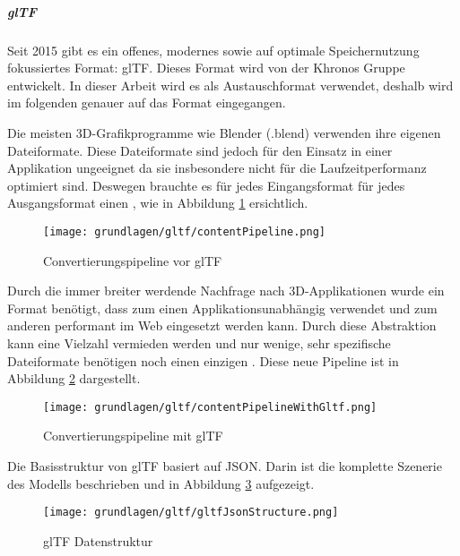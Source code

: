 \subparagraph{glTF}
Seit 2015 gibt es ein offenes, modernes sowie auf optimale Speichernutzung fokussiertes Format: glTF. Dieses Format wird von der Khronos Gruppe entwickelt. \cite{gltf1Spec} In dieser Arbeit wird es als Austauschformat verwendet, deshalb wird im folgenden genauer auf das Format eingegangen.

Die meisten 3D-Grafikprogramme wie Blender (.blend) verwenden ihre eigenen Dateiformate. Diese Dateiformate sind jedoch für den Einsatz in einer Applikation ungeeignet da sie insbesondere nicht für die Laufzeitperformanz optimiert sind. Deswegen brauchte es für jedes Eingangsformat für jedes Ausgangsformat einen , wie in Abbildung \ref{fig:contentPipelineWithoutGltf} ersichtlich.

\begin{figure}[H]
  \centering
  \texttt{[image: grundlagen/gltf/contentPipeline.png]}
  \caption{Convertierungspipeline vor glTF \cite{gltf1Spec}}
  \label{fig:contentPipelineWithoutGltf}
\end{figure}

Durch die immer breiter werdende Nachfrage nach 3D-Applikationen wurde ein Format benötigt, dass zum einen Applikationsunabhängig verwendet und zum anderen performant im Web eingesetzt werden kann. \cite{gltf1Spec}
Durch diese Abstraktion kann eine Vielzahl  vermieden werden und nur wenige, sehr spezifische Dateiformate benötigen noch einen einzigen . Diese neue Pipeline ist in Abbildung \ref{fig:contentPipelineWithGltf} dargestellt. \cite{gltf1Spec}
\begin{figure}[H]
  \centering
  \texttt{[image: grundlagen/gltf/contentPipelineWithGltf.png]}
  \caption{Convertierungspipeline mit glTF \cite{gltf1Spec}}
  \label{fig:contentPipelineWithGltf}
\end{figure}

Die Basisstruktur von glTF basiert auf JSON. Darin ist die komplette Szenerie des Modells beschrieben und in Abbildung \ref{fig:gltfDatastructure} aufgezeigt.\cite{gltf1Spec}
\begin{figure}[H]
  \centering
  \texttt{[image: grundlagen/gltf/gltfJsonStructure.png]}
  \caption{glTF Datenstruktur \cite{gltf1Spec}}
  \label{fig:gltfDatastructure}
\end{figure}


